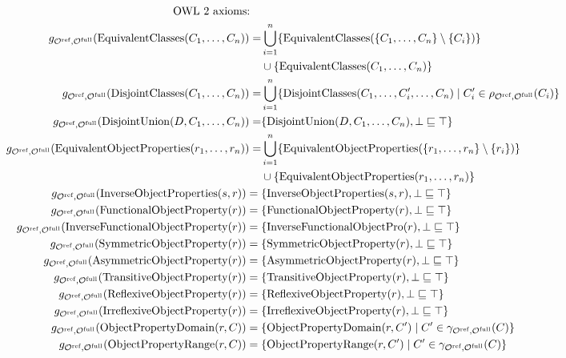 \begin{widepage}
\begin{align*}
    \text{OWL 2 axioms:} \quad & \\
    g_{{\mathcal{O}^\textnormal{ref}},{\mathcal{O}^\textnormal{full}}}(\mathrm{EquivalentClasses}(C_1, \dots, C_n)) = & \bigcup_{i=1}^n \{ \mathrm{EquivalentClasses}(\{C_1, \dots, C_n\} \setminus \{C_i\}) \} \\& \cup \{ \mathrm{EquivalentClasses}(C_1, \dots, C_n) \} \\
    g_{{\mathcal{O}^\textnormal{ref}},{\mathcal{O}^\textnormal{full}}}(\mathrm{DisjointClasses}(C_1, \dots, C_n)) = & \bigcup_{i=1}^n \{ \mathrm{DisjointClasses}(C_1, \dots, C_i', \dots, C_n) \mid C_i' \in \rho_{{\mathcal{O}^\textnormal{ref}},{\mathcal{O}^\textnormal{full}}}(C_i) \} \\
    g_{{\mathcal{O}^\textnormal{ref}},{\mathcal{O}^\textnormal{full}}}(\mathrm{DisjointUnion}(D, C_1, \dots, C_n)) = & \{ \mathrm{DisjointUnion}(D, C_1, \dots, C_n), \bot \sqsubseteq \top \} \\
    g_{{\mathcal{O}^\textnormal{ref}},{\mathcal{O}^\textnormal{full}}}(\mathrm{EquivalentObjectProperties}(r_1, \dots, r_n)) = & \bigcup_{i=1}^n \{ \mathrm{EquivalentObjectProperties}(\{r_1, \dots, r_n\} \setminus \{r_i\}) \} \\& \cup \{ \mathrm{EquivalentObjectProperties}(r_1, \dots, r_n) \} \\
    g_{{\mathcal{O}^\textnormal{ref}},{\mathcal{O}^\textnormal{full}}}(\mathrm{InverseObjectProperties}(s, r)) ={} & \{ \mathrm{InverseObjectProperties}(s, r), \bot \sqsubseteq \top \} \\
    g_{{\mathcal{O}^\textnormal{ref}},{\mathcal{O}^\textnormal{full}}}(\mathrm{FunctionalObjectProperty}(r)) ={} & \{ \mathrm{FunctionalObjectProperty}(r), \bot \sqsubseteq \top \} \\
    g_{{\mathcal{O}^\textnormal{ref}},{\mathcal{O}^\textnormal{full}}}(\mathrm{InverseFunctionalObjectProperty}(r)) ={} & \{ \mathrm{InverseFunctionalObjectPro}(r), \bot \sqsubseteq \top \} \\
    g_{{\mathcal{O}^\textnormal{ref}},{\mathcal{O}^\textnormal{full}}}(\mathrm{SymmetricObjectProperty}(r)) ={} & \{ \mathrm{SymmetricObjectProperty}(r), \bot \sqsubseteq \top \} \\
    g_{{\mathcal{O}^\textnormal{ref}},{\mathcal{O}^\textnormal{full}}}(\mathrm{AsymmetricObjectProperty}(r)) ={} & \{ \mathrm{AsymmetricObjectProperty}(r), \bot \sqsubseteq \top \} \\
    g_{{\mathcal{O}^\textnormal{ref}},{\mathcal{O}^\textnormal{full}}}(\mathrm{TransitiveObjectProperty}(r)) ={} & \{ \mathrm{TransitiveObjectProperty}(r), \bot \sqsubseteq \top \} \\
    g_{{\mathcal{O}^\textnormal{ref}},{\mathcal{O}^\textnormal{full}}}(\mathrm{ReflexiveObjectProperty}(r)) ={} & \{ \mathrm{ReflexiveObjectProperty}(r), \bot \sqsubseteq \top \} \\
    g_{{\mathcal{O}^\textnormal{ref}},{\mathcal{O}^\textnormal{full}}}(\mathrm{IrreflexiveObjectProperty}(r)) ={} & \{ \mathrm{IrreflexiveObjectProperty}(r), \bot \sqsubseteq \top \} \\
    g_{{\mathcal{O}^\textnormal{ref}},{\mathcal{O}^\textnormal{full}}}(\mathrm{ObjectPropertyDomain}(r, C)) ={} & \{\mathrm{ObjectPropertyDomain}(r, C') \mid C' \in \gamma_{{\mathcal{O}^\textnormal{ref}},{\mathcal{O}^\textnormal{full}}} (C)\} \\
    g_{{\mathcal{O}^\textnormal{ref}},{\mathcal{O}^\textnormal{full}}}(\mathrm{ObjectPropertyRange}(r, C)) ={} & \{\mathrm{ObjectPropertyRange}(r, C') \mid C' \in \gamma_{{\mathcal{O}^\textnormal{ref}},{\mathcal{O}^\textnormal{full}}} (C)\}
  \end{align*}
\end{widepage}
